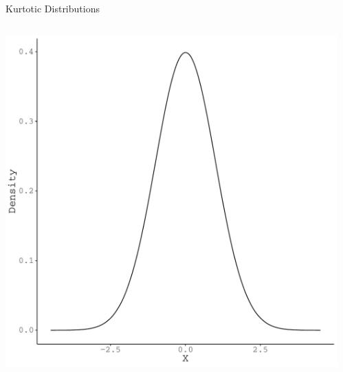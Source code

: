 \documentclass{beamer}\usepackage[]{graphicx}\usepackage[]{color}
\makeatletter
\def\maxwidth{ %
  \ifdim\Gin@nat@width>\linewidth
    \linewidth
  \else
    \Gin@nat@width
  \fi
}
\newenvironment{knitrout}{}{} %
\makeatother
\begin{document}
\watermarkoff %

\begin{frame}{Kurtotic Distributions}
  
  \begin{columns}
    \begin{column}{0.5\textwidth}
  
\begin{knitrout}\footnotesize
{}\color{fgcolor}

{\centering \includegraphics[width=\maxwidth]{figure/unnamed-chunk-26-1} 

}



\end{knitrout}

    \end{column}
    
    \begin{column}{0.5\textwidth}
        
\begin{knitrout}\footnotesize
{}\color{fgcolor}


\end{knitrout}
\end{column}
\end{columns}
\end{frame}
\end{document}
